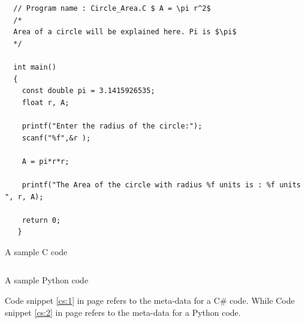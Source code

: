 \documentclass[10pt,a4paper]{article}
\begin{document}
\begin{listing}
\begin{verbatim}
  // Program name : Circle_Area.C $ A = \pi r^2$
  /*
  Area of a circle will be explained here. Pi is $\pi$
  */
  
  int main()
  {
    const double pi = 3.1415926535;
    float r, A;
    
    printf("Enter the radius of the circle:");
    scanf("%f",&r );
    
    A = pi*r*r;
    
    printf("The Area of the circle with radius %f units is : %f units ", r, A);
   
    return 0;
   }

\end{verbatim}
\caption{A sample C code}
  \label{cs:1}
\end{listing}

\begin{listing}

\inputminted[mathescape, linenos, firstline=4, lastline=10, numbersep=5pt, gobble=0, frame=lines, framesep=2mm]{python}{ode_solve1.py}

\caption{A sample Python code}
  \label{cs:2}
\end{listing}

Code snippet \ref{cs:1} in page \pageref{cs:1} refers to the meta-data for a C# code. While Code snippet \ref{cs:2} in page \pageref{cs:2} refers to the meta-data for a Python code.


\end{document}
